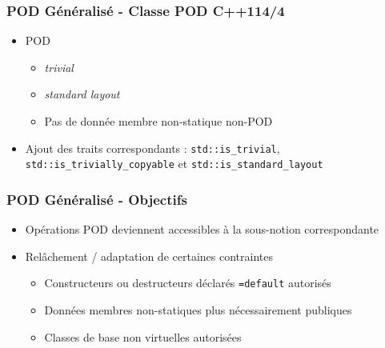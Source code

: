 \documentclass[C++.tex]{subfiles}
\begin{document}
\begin{frame}[fragile]
	\frametitle{POD Généralisé - Classe POD C++11\titlehfill{}4/4}
	\begin{itemize}
		\item POD
		\begin{itemize}
			\item \textit{trivial}
			\item \textit{standard layout}
			\item Pas de donnée membre non-statique non-POD
		\end{itemize}
		\item Ajout des traits correspondants : \lstinline|std::is_trivial|, \lstinline|std::is_trivially_copyable| et \lstinline|std::is_standard_layout|
	\end{itemize}
\end{frame}

\begin{frame}[fragile]
	\frametitle{POD Généralisé - Objectifs}
	\begin{itemize}
		\item Opérations POD deviennent accessibles à la sous-notion correspondante
		\item Relâchement / adaptation de certaines contraintes
		\begin{itemize}
			\item Constructeurs ou destructeurs déclarés \lstinline|=default| autorisés
			\item Données membres non-statiques plus nécessairement publiques


			\item Classes de base non virtuelles autorisées

		\end{itemize}
	\end{itemize}
\end{frame}
\end{document}
